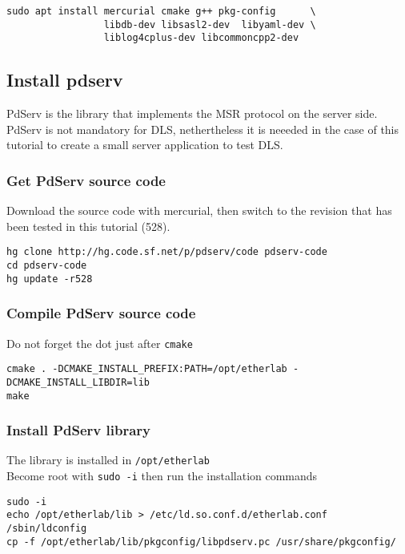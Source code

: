 \begin{verbatim}
sudo apt install mercurial cmake g++ pkg-config      \
                 libdb-dev libsasl2-dev  libyaml-dev \
                 liblog4cplus-dev libcommoncpp2-dev
\end{verbatim}



\subsection{Install pdserv}

PdServ is the library that implements the MSR protocol on the server side.
PdServ is not mandatory for DLS, nethertheless it is neeeded in the case of this tutorial to create a small server application to test DLS.


\subsubsection{Get PdServ source code}
Download the source code with mercurial, then switch to the revision
that has been tested in this tutorial (528).
\begin{verbatim}
hg clone http://hg.code.sf.net/p/pdserv/code pdserv-code
cd pdserv-code
hg update -r528
\end{verbatim}

\subsubsection{Compile PdServ source code}

Do not forget the dot just after \texttt{cmake}
\begin{verbatim}
cmake . -DCMAKE_INSTALL_PREFIX:PATH=/opt/etherlab -DCMAKE_INSTALL_LIBDIR=lib
make
\end{verbatim}


\subsubsection{Install PdServ library}
The library is installed in \texttt{/opt/etherlab} \\
Become root with \texttt{sudo -i} then run the installation commands

\begin{verbatim}
sudo -i
echo /opt/etherlab/lib > /etc/ld.so.conf.d/etherlab.conf
/sbin/ldconfig
cp -f /opt/etherlab/lib/pkgconfig/libpdserv.pc /usr/share/pkgconfig/
\end{verbatim}


